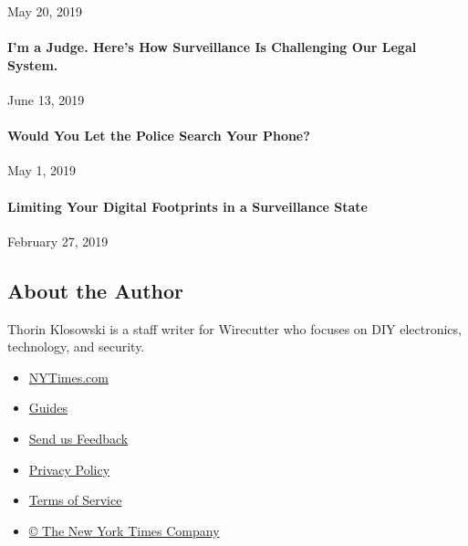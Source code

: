 May 20, 2019

\href{https://www.nytimes3xbfgragh.onion/2019/06/13/opinion/privacy-law-enforcment-congress.html}{}

\hypertarget{im-a-judge-heres-how-surveillance-is-challenging-our-legal-system}{%
\paragraph{I'm a Judge. Here's How Surveillance Is Challenging Our Legal
System.}\label{im-a-judge-heres-how-surveillance-is-challenging-our-legal-system}}

June 13, 2019

\href{https://www.nytimes3xbfgragh.onion/2019/04/30/opinion/police-phone-privacy.html}{}

\hypertarget{would-you-let-the-police-search-your-phone}{%
\paragraph{Would You Let the Police Search Your
Phone?}\label{would-you-let-the-police-search-your-phone}}

May 1, 2019

\href{https://www.nytimes3xbfgragh.onion/2019/02/27/technology/personaltech/digital-footprint-surveillance.html}{}

\hypertarget{limiting-your-digital-footprints-in-a-surveillance-state}{%
\paragraph{Limiting Your Digital Footprints in a Surveillance
State}\label{limiting-your-digital-footprints-in-a-surveillance-state}}

February 27, 2019

\hypertarget{about-the-author}{%
\subsection{About the Author}\label{about-the-author}}

Thorin Klosowski is a staff writer for Wirecutter who focuses on DIY
electronics, technology, and security.~

\begin{itemize}
\tightlist
\item
  \href{https://www.nytimes3xbfgragh.onion}{NYTimes.com}
\item
  \href{//www.nytimes3xbfgragh.onion/spotlight/guides}{Guides}
\item
  \href{https://nyt.qualtrics.com/jfe/form/SV_7VuAQJbpWqaxzUh?AGENT_ID=}{Send
  us Feedback}
\end{itemize}

\begin{itemize}
\tightlist
\item
  \href{http://www.nytimes3xbfgragh.onion/privacy}{Privacy Policy}
\item
  \href{http://www.nytimes3xbfgragh.onion/ref/membercenter/help/agree.html}{Terms
  of Service}
\item
  \href{http://www.nytimes3xbfgragh.onion/content/help/rights/copyright/copyright-notice.html}{©
  The New York Times Company}
\end{itemize}
